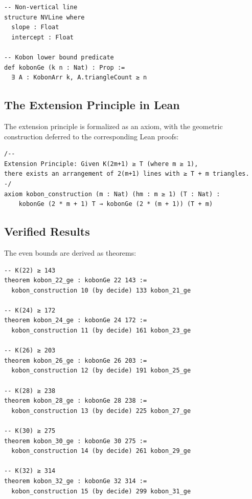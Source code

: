 \documentclass[11pt,a4paper]{article}
\theoremstyle{plain}
\theoremstyle{definition}
\theoremstyle{remark}
\begin{document}
\begin{lstlisting}[language=Lean, basicstyle=\ttfamily\small]
-- Non-vertical line
structure NVLine where
  slope : Float
  intercept : Float

-- Kobon lower bound predicate
def kobonGe (k n : Nat) : Prop :=
  ∃ A : KobonArr k, A.triangleCount ≥ n
\end{lstlisting}

\subsection{The Extension Principle in Lean}

The extension principle is formalized as an axiom, with the geometric construction deferred to the corresponding Lean proofs:

\begin{lstlisting}[language=Lean, basicstyle=\ttfamily\small]
/--
Extension Principle: Given K(2m+1) ≥ T (where m ≥ 1),
there exists an arrangement of 2(m+1) lines with ≥ T + m triangles.
-/
axiom kobon_construction (m : Nat) (hm : m ≥ 1) (T : Nat) :
    kobonGe (2 * m + 1) T → kobonGe (2 * (m + 1)) (T + m)
\end{lstlisting}

\subsection{Verified Results}

The even bounds are derived as theorems:

\begin{lstlisting}[language=Lean, basicstyle=\ttfamily\small]
-- K(22) ≥ 143
theorem kobon_22_ge : kobonGe 22 143 :=
  kobon_construction 10 (by decide) 133 kobon_21_ge

-- K(24) ≥ 172
theorem kobon_24_ge : kobonGe 24 172 :=
  kobon_construction 11 (by decide) 161 kobon_23_ge

-- K(26) ≥ 203
theorem kobon_26_ge : kobonGe 26 203 :=
  kobon_construction 12 (by decide) 191 kobon_25_ge

-- K(28) ≥ 238
theorem kobon_28_ge : kobonGe 28 238 :=
  kobon_construction 13 (by decide) 225 kobon_27_ge

-- K(30) ≥ 275
theorem kobon_30_ge : kobonGe 30 275 :=
  kobon_construction 14 (by decide) 261 kobon_29_ge

-- K(32) ≥ 314
theorem kobon_32_ge : kobonGe 32 314 :=
  kobon_construction 15 (by decide) 299 kobon_31_ge
\end{lstlisting}
\end{document}

